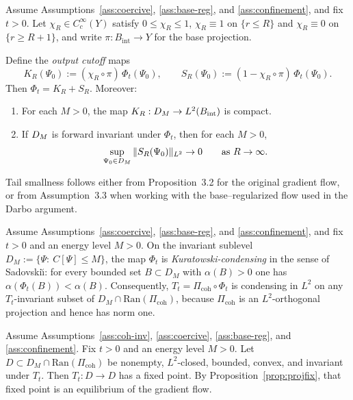 \documentclass[11pt]{article}
\providecommand{\Bint}{B_{\mathrm{int}}}
\providecommand{\PiCoh}{\Pi_{\mathrm{coh}}}
\providecommand{\Ran}{\mathrm{Ran}}
\begin{document}
\begin{lemma}\label{lem:KR}
Assume Assumptions~\ref{ass:coercive}, \ref{ass:base-reg}, and
\ref{ass:confinement}, and fix $t>0$.
Let $\chi_R\in C_c^\infty(Y)$ satisfy $0\le \chi_R\le 1$, $\chi_R\equiv 1$ on $\{r\le R\}$ and
$\chi_R\equiv 0$ on $\{r\ge R+1\}$, and write $\pi:\Bint\to Y$ for the base projection.

Define the \emph{output cutoff} maps
\[
K_R(\Psi_0):=(\chi_R\circ\pi)\,\Phi_t(\Psi_0),
\qquad
S_R(\Psi_0):=(1-\chi_R\circ\pi)\,\Phi_t(\Psi_0).
\]
Then $\Phi_t=K_R+S_R$. Moreover:
\begin{enumerate}[label=\textup{(\roman*)}]
\item For each $M>0$, the map $K_R:\DM\to L^2(\Bint)$ is compact.
\item If $D_M$ is forward invariant under $\Phi_t$, then for each $M>0$,
\[
\sup_{\Psi_0\in D_M}\|S_R(\Psi_0)\|_{L^2}\to 0
\qquad\text{as }R\to\infty.
\]
\end{enumerate}
\end{lemma}


\begin{remark}
Tail smallness follows either from Proposition~3.2 for the original gradient flow,
or from Assumption~3.3 when working with the base--regularized flow used in the Darbo argument.


\end{remark}

\begin{proposition}\label{prop:condensing}
Assume Assumptions~\ref{ass:coercive}, \ref{ass:base-reg}, and
\ref{ass:confinement}, and fix $t>0$ and an energy level $M>0$.
On the invariant sublevel $D_M:=\{\Psi:\ C[\Psi]\le M\}$, the map $\Phi_t$ is \emph{Kuratowski-condensing} in the sense of Sadovski\u{\i}:
for every bounded set $B\subset D_M$ with $\alpha(B)>0$ one has $\alpha(\Phi_t(B))<\alpha(B)$.
Consequently, $T_t=\PiCoh\circ\Phi_t$ is condensing in $L^2$ on any
$T_t$-invariant subset of $D_M\cap \Ran(\PiCoh)$, because $\PiCoh$ is an
$L^2$-orthogonal projection and hence has norm one.
\end{proposition}


\begin{theorem}\label{thm:darbo}
Assume Assumptions~\ref{ass:coh-inv}, \ref{ass:coercive}, \ref{ass:base-reg}, and \ref{ass:confinement}.
Fix $t>0$ and an energy level $M>0$. Let
$D\subset D_M\cap\Ran(\PiCoh)$ be nonempty, $L^2$-closed, bounded, convex,
and invariant under $T_t$. Then $T_t:D\to D$ has a fixed point. By
Proposition~\ref{prop:projfix}, that fixed point is an equilibrium of the
gradient flow.
\end{theorem}
\end{document}
